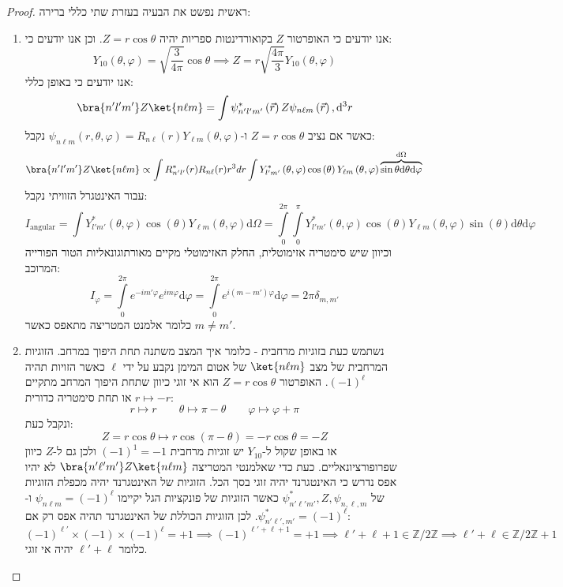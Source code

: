 \documentclass{tstextbook}
\begin{document}
\begin{proof}
ראשית נפשט את הבעיה בעזרת שתי כללי ברירה:

  \begin{enumerate}
    \item אנו יודעים כי האופרטור \(Z\) בקואורדינטות ספריות יהיה \(Z=r\cos \theta\). וכן אנו יודעים כי: 
$$Y_{10}\left( \theta,\varphi \right)=\sqrt{\frac{3}{4\pi}}\cos\theta\implies Z=r\sqrt{\frac{4\pi}{3}}Y_{10}\left( \theta,\varphi \right)$$
אנו יודעים כי באופן כללי:
$$ \bra{n'l'm'}Z\ket{n\ell m} = \int \psi_{n'l'm'}^*\left( \vec{r} \right)  Z  \psi_{n\ell m}\left( \vec{r} \right) , \mathrm{d}^3r $$
כאשר אם נציב \(Z=r\cos \theta\) ו-\(\psi_{n\ell m}\left( r,\theta,\varphi \right)=R_{n\ell}(r)Y_{\ell m}\left( \theta,\varphi \right)\) נקבל:
$$ \bra{n'l'm'}Z\ket{n\ell m} \propto \int R_{n'l'}^*(r) R_{n\ell}(r) r^3 dr \int Y_{l'm'}^*\left( \theta, \varphi \right)  \cos \left( \theta \right)  Y_{\ell m}\left( \theta, \varphi \right)  \overbrace{ \sin \theta\mathrm{d}\theta \mathrm{d}\varphi }^{ \mathrm{d}\Omega } $$
עבור האינטגרל הזוויתי נקבל:
$$ I_{\text{angular}} = \int Y_{l'm'}^*\left( \theta, \varphi \right)  \cos \left( \theta \right)  Y_{\ell m}\left( \theta, \varphi \right)  \mathrm{d}\Omega = \int\limits_0^{2\pi} \!\!\!\int\limits_0^{\pi} Y_{l'm'}^*\left( \theta, \varphi \right)  \cos \left( \theta \right)  Y_{\ell m}\left( \theta, \varphi \right)  \sin \left( \theta  \right) \mathrm{d}\theta  \mathrm{d}\varphi $$
וכיוון שיש סימטריה אזימוטלית, החלק האזימוטלי מקיים מאורתוגונאליות הטור הפורייה המרוכב:
$$ I_{\varphi} = \int\limits_0^{2\pi} e^{-im'\varphi} e^{im\varphi} \mathrm{d}\varphi = \int\limits_0^{2\pi} e^{i(m-m')\varphi} \mathrm{d}\varphi =2\pi \delta_{m,m'}$$
כלומר אלמנט המטריצה מתאפס כאשר \(m\neq m'\). 


    \item נשתמש כעת בזוגיות מרחבית - כלומר איך המצב משתנה תחת היפוך במרחב. הזוגיות המרחבית של מצב \(\ket{n\ell m}\) של אטום המימן נקבע על ידי \(\ell\) כאשר הזויות תהיה \((-1)^{\ell}\). האופרטור \(Z=r\cos \theta\) הוא אי זוגי כיוון שתחת היפוך המרחב מתקיים \(r \mapsto -r\) או תחת סימטריה כדורית: 
$$r \mapsto r\qquad \theta \mapsto \pi-\theta \qquad \varphi \mapsto \varphi+\pi$$
ונקבל כעת:
$$Z=r\cos \theta \mapsto r\cos\left( \pi-\theta \right)=-r\cos \theta=-Z$$
או באופן שקול ל-\(Y_{10}\) יש זוגיות מרחבית \((-1)^{1}=-1\) ולכן גם ל-\(Z\) כיוון שפרופורציונאליים. כעת כדי שאלמנטי המטריצה \(\bra{n'\ell'm'}Z\ket{n\ell m}\) לא יהיו אפס נדרש כי האינטגרנד יהיה זוגי בסך הכל. הזוגיות של האינטגרנד יהיה מכפלת הזוגיות של \(\psi^{*}_{n'\ell'm'},Z,\psi_{n,\ell,m}\) כאשר הזוגיות של פונקציות הגל יקיימו \(\psi_{n\ell m}=(-1)^{\ell}\) ו-\(\psi^{*}_{n'\ell',m'}=(-1)^{\ell}\). לכן הזוגיות הכוללת של האינטגרנד תהיה אפס רק אם:
$$ (-1)^{\ell'} \times (-1) \times (-1)^{\ell} = +1 \implies (-1)^{\ell' + \ell + 1} = +1 \implies \ell'+\ell +1\in \mathbb{Z} / 2\mathbb{Z}\implies\ell'+\ell \in \mathbb{Z} / 2\mathbb{Z}+1$$
כלומר \(\ell'+\ell\) יהיה אי זוגי. 


  \end{enumerate}
\end{proof}
\end{document}
